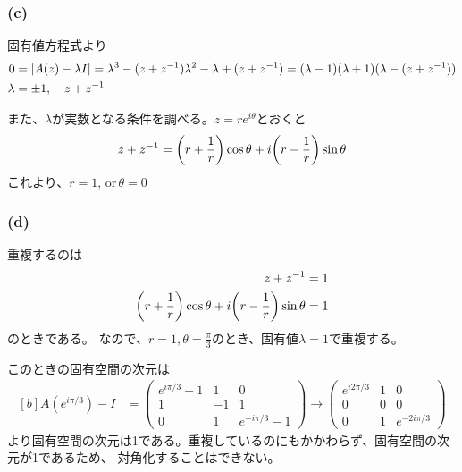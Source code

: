 \documentclass[../../sp_2023.tex]{subfiles}
\begin{document}
\subsubsection{(c)}
固有値方程式より
\begin{equation}\begin{aligned}[b]
    0 &= \abs{A(z)-\lambda I}
    =\lambda^3-(z+z^{-1})\lambda^2-\lambda+(z+z^{-1})
    =(\lambda-1)(\lambda+1)(\lambda-(z+z^{-1}))\\
    \lambda &= \pm 1, \quad z+z^{-1}
\end{aligned}\end{equation}

また、\(\lambda\)が実数となる条件を調べる。\(z=re^{i\theta}\)とおくと
\begin{equation}\begin{aligned}[b]
    z+z^{-1}=\qty(r+\frac{1}{r})\cos\theta+i\qty(r-\frac{1}{r})\sin\theta
\end{aligned}\end{equation}
これより、\(r=1,\,\text{or}\,\theta = 0\)

\subsubsection{(d)}
重複するのは
\begin{equation}\begin{aligned}[b]
    z+z^{-1}&=1\\
    \qty(r+\frac{1}{r})\cos\theta+i\qty(r-\frac{1}{r})\sin\theta &= 1
\end{aligned}\end{equation}
のときである。
なので、\(r=1,\theta=\frac{\pi}{3}\)のとき、固有値\(\lambda=1\)で重複する。

このときの固有空間の次元は
\begin{equation}\begin{aligned}[b]
    A(e^{i\pi/3})-I &= \begin{pmatrix}
        e^{i\pi/3}- 1& 1 & 0\\
        1 & -1 & 1\\
        0 & 1 & e^{-i\pi/3}-1
    \end{pmatrix}
    \to \begin{pmatrix}
        e^{i2\pi/3}& 1 & 0\\
        0 & 0 & 0\\
        0 & 1 & e^{-2i\pi/3}
    \end{pmatrix}
\end{aligned}\end{equation}
より固有空間の次元は1である。重複しているのにもかかわらず、固有空間の次元が1であるため、
対角化することはできない。
\end{document}
